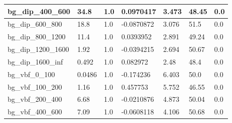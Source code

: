 \documentclass[a4paper, 10pt]{article}
\begin{document}
\begin{table}[H]
\begin{center}
\begin{tabular}{|m{23.0mm}|m{23.0mm}|m{18.0mm}|m{19.0mm}|m{19.0mm}|m{19.0mm}|m{19.0mm}|}
      \hline
      {\cellcolor{white}         bg\_dip\_400\_600}& {\cellcolor{white}         34.8}& {\cellcolor{white}         1.0}& {\cellcolor{white}         0.0970417}& {\cellcolor{white}         3.473}& {\cellcolor{red}         48.45}& {\cellcolor{red}         0.0}\\
      \hline
      {\cellcolor{white}         bg\_dip\_600\_800}& {\cellcolor{white}         18.8}& {\cellcolor{white}         1.0}& {\cellcolor{white}         -0.0870872}& {\cellcolor{white}         3.076}& {\cellcolor{red}         51.5}& {\cellcolor{red}         0.0}\\
      \hline
      {\cellcolor{white}         bg\_dip\_800\_1200}& {\cellcolor{white}         11.4}& {\cellcolor{white}         1.0}& {\cellcolor{white}         0.0393952}& {\cellcolor{white}         2.891}& {\cellcolor{red}         49.24}& {\cellcolor{red}         0.0}\\
      \hline
      {\cellcolor{white}         bg\_dip\_1200\_1600}& {\cellcolor{white}         1.92}& {\cellcolor{white}         1.0}& {\cellcolor{white}         -0.0394215}& {\cellcolor{white}         2.694}& {\cellcolor{red}         50.67}& {\cellcolor{red}         0.0}\\
      \hline
      {\cellcolor{white}         bg\_dip\_1600\_inf}& {\cellcolor{white}         0.492}& {\cellcolor{white}         1.0}& {\cellcolor{white}         0.082972}& {\cellcolor{white}         2.48}& {\cellcolor{red}         48.4}& {\cellcolor{red}         0.0}\\
      \hline
      {\cellcolor{white}         bg\_vbf\_0\_100}& {\cellcolor{white}         0.0486}& {\cellcolor{white}         1.0}& {\cellcolor{white}         -0.174236}& {\cellcolor{white}         6.403}& {\cellcolor{red}         50.0}& {\cellcolor{red}         0.0}\\
      \hline
      {\cellcolor{white}         bg\_vbf\_100\_200}& {\cellcolor{white}         1.16}& {\cellcolor{white}         1.0}& {\cellcolor{white}         0.457753}& {\cellcolor{white}         5.752}& {\cellcolor{red}         46.55}& {\cellcolor{red}         0.0}\\
      \hline
      {\cellcolor{white}         bg\_vbf\_200\_400}& {\cellcolor{white}         6.68}& {\cellcolor{white}         1.0}& {\cellcolor{white}         -0.0210876}& {\cellcolor{white}         4.873}& {\cellcolor{red}         50.04}& {\cellcolor{red}         0.0}\\
      \hline
      {\cellcolor{white}         bg\_vbf\_400\_600}& {\cellcolor{white}         7.09}& {\cellcolor{white}         1.0}& {\cellcolor{white}         -0.0608118}& {\cellcolor{white}         4.106}& {\cellcolor{red}         50.68}& {\cellcolor{red}         0.0}\\

\end{tabular}
\end{center}
\end{table}
\end{document}

